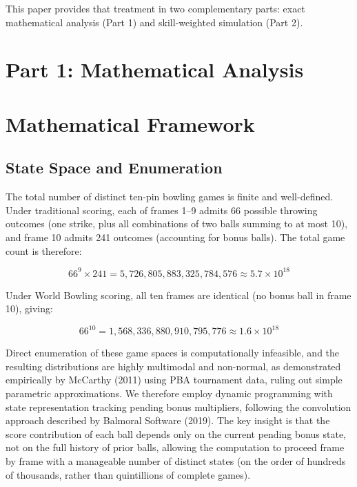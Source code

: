 \documentclass[
  letterpaper,
  DIV=11,
  numbers=noendperiod]{scrartcl}
\begin{document}
This paper provides that treatment in two complementary parts: exact
mathematical analysis (Part 1) and skill-weighted simulation (Part 2).

\section*{Part 1: Mathematical
Analysis}\label{part-1-mathematical-analysis}

\section{Mathematical Framework}\label{mathematical-framework}

\subsection{State Space and
Enumeration}\label{state-space-and-enumeration}

The total number of distinct ten-pin bowling games is finite and
well-defined. Under traditional scoring, each of frames 1--9 admits 66
possible throwing outcomes (one strike, plus all combinations of two
balls summing to at most 10), and frame 10 admits 241 outcomes
(accounting for bonus balls). The total game count is therefore:

\[66^9 \times 241 = 5{,}726{,}805{,}883{,}325{,}784{,}576 \approx 5.7 \times 10^{18}\]

Under World Bowling scoring, all ten frames are identical (no bonus ball
in frame 10), giving:

\[66^{10} = 1{,}568{,}336{,}880{,}910{,}795{,}776 \approx 1.6 \times 10^{18}\]

Direct enumeration of these game spaces is computationally infeasible,
and the resulting distributions are highly multimodal and non-normal, as
demonstrated empirically by McCarthy (2011) using PBA tournament data,
ruling out simple parametric approximations. We therefore employ dynamic
programming with state representation tracking pending bonus
multipliers, following the convolution approach described by Balmoral
Software (2019). The key insight is that the score contribution of each
ball depends only on the current pending bonus state, not on the full
history of prior balls, allowing the computation to proceed frame by
frame with a manageable number of distinct states (on the order of
hundreds of thousands, rather than quintillions of complete games).
\end{document}
